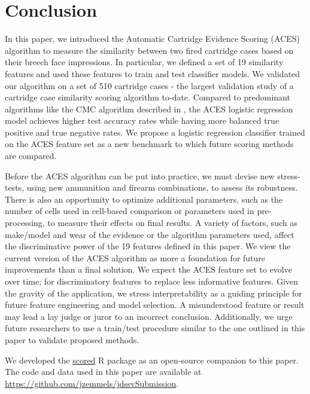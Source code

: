 \documentclass[11pt,]{isuthesis}
\begin{document}
\hypertarget{conclusion-2}{%
\section{Conclusion}\label{conclusion-2}}

In this paper, we introduced the Automatic Cartridge Evidence Scoring (ACES) algorithm to measure the similarity between two fired cartridge cases based on their breech face impressions.
In particular, we defined a set of 19 similarity features and used these features to train and test classifier models.
We validated our algorithm on a set of 510 cartridge cases - the largest validation study of a cartridge case similarity scoring algorithm to-date.
Compared to predominant algorithms like the CMC algorithm described in \citet{song_proposed_2013}, the ACES logistic regression model achieves higher test accuracy rates while having more balanced true positive and true negative rates.
We propose a logistic regression classifier trained on the ACES feature set as a new benchmark to which future scoring methods are compared.

Before the ACES algorithm can be put into practice, we must devise new stress-tests, using new ammunition and firearm combinations, to assess its robustness.
There is also an opportunity to optimize additional parameters, such as the number of cells used in cell-based comparison or parameters used in pre-processing, to measure their effects on final results.
A variety of factors, such as make/model and wear of the evidence or the algorithm parameters used, affect the discriminative power of the 19 features defined in this paper.
We view the current version of the ACES algorithm as more a foundation for future improvements than a final solution.
We expect the ACES feature set to evolve over time; for discriminatory features to replace less informative features.
Given the gravity of the application, we stress interpretability as a guiding principle for future feature engineering and model selection.
A misunderstood feature or result may lead a lay judge or juror to an incorrect conclusion.
Additionally, we urge future researchers to use a train/test procedure similar to the one outlined in this paper to validate proposed methods.

We developed the \href{https://jzemmels.github.io/scored/}{scored} R package as an open-source companion to this paper.
The code and data used in this paper are available at \url{https://github.com/jzemmels/jdssvSubmission}.

\newpage
\end{document}
